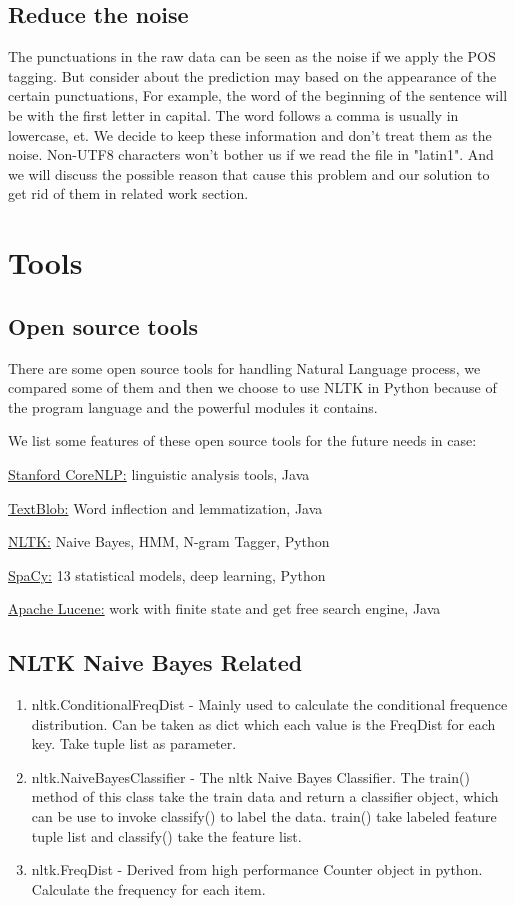 \documentclass[a4paper]{article}
\begin{document}
\subsection{Reduce the noise}
The punctuations in the raw data can be seen as the noise 
if we apply the POS tagging. But consider about the prediction may based on the appearance of the certain punctuations, For example, the word of the beginning of the sentence will be with the first letter in capital. The word follows a comma is usually in lowercase, et. We decide to keep these information and don't treat them as the noise.
Non-UTF8 characters won't bother us if we read the file in "latin1". And we will discuss the possible reason that cause this problem and our solution to get rid of them in related work section.


\section{Tools}
\subsection{Open source tools}
There are some open source tools for handling Natural Language process, we compared some of them and then we choose to use NLTK in Python because of the program language and the powerful modules it contains. 

We list some features of these open source tools for the future needs in case:

\href{https://stanfordnlp.github.io/CoreNLP/}{Stanford CoreNLP:} linguistic analysis tools, Java

\href{http://textblob.readthedocs.io/en/dev/}{TextBlob:} Word inflection and lemmatization, Java

\href{https://www.nltk.org/}{NLTK:} Naive Bayes, HMM, N-gram Tagger, Python

\href{https://spacy.io/}{SpaCy:} 13 statistical models, deep learning, Python

\href{http://lucene.apache.org/}{Apache Lucene:} work with finite state and get free search engine, Java

\subsection{NLTK Naive Bayes Related}

\begin{enumerate}
\item nltk.ConditionalFreqDist - Mainly used to calculate the conditional frequence distribution. Can be taken as dict which each value is the FreqDist for each key. Take tuple list as parameter.
\item nltk.NaiveBayesClassifier - The nltk Naive Bayes Classifier. The train() method of this class take the train data and return a classifier object, which can be use to invoke classify() to label the data. train() take labeled feature tuple list and classify() take the feature list.
\item nltk.FreqDist - Derived from high performance Counter object in python. Calculate the frequency for each item.
\end{enumerate}
\end{document}
